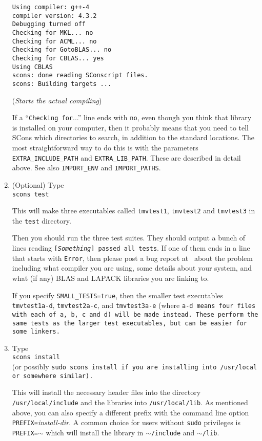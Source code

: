 \begin{enumerate}
\begin{verbatim}
Using compiler: g++-4
compiler version: 4.3.2
Debugging turned off
Checking for MKL... no
Checking for ACML... no
Checking for GotoBLAS... no
Checking for CBLAS... yes
Using CBLAS
scons: done reading SConscript files.
scons: Building targets ...
\end{verbatim}
\vspace{-8pt}(\emph{Starts the actual compiling})

If a ``\texttt{Checking for}...'' line ends with \texttt{no}, even though you think that library is installed
on your computer, then it probably means that you need to tell SCons which directories
to search, in addition to the standard locations.  The most straightforward way to do this is
with the parameters \texttt{EXTRA\_INCLUDE\_PATH} and \texttt{EXTRA\_LIB\_PATH}.  
These are described in detail above.  See also \texttt{IMPORT\_ENV} and \texttt{IMPORT\_PATHS}.

\item (Optional) Type\\
\texttt{scons test}

This will make three executables called \texttt{tmvtest1}, 
\texttt{tmvtest2} and \texttt{tmvtest3} in the \texttt{test} directory.

Then you should run the three test suites.
They should output a bunch of lines reading \texttt{[{\em Something}] passed all tests}.
If one of them ends in a line that starts with \texttt{Error}, 
then please post a bug report at \myissues\ about the problem including what compiler
you are using, some details about your system, and what (if any) BLAS and LAPACK
libraries you are linking to.

If you specify \texttt{SMALL\_TESTS=true}, then the smaller test executables
\texttt{tmvtest1a-d}, \texttt{tmvtest2a-c}, and \texttt{tmvtest3a-e} (where \tt{a-d} means 
four files with each of \tt{a}, \tt{b}, \tt{c} and \tt{d})
will be made instead.
These perform the same tests as the larger test executables, but can be easier
for some linkers.

\item Type\\
\texttt{scons install}\\
(or possibly \tt{sudo scons install} if you are installing into \tt{/usr/local} or somewhere similar).

This will install the necessary header files into the directory \texttt{/usr/local/include} and the libraries
into \texttt{/usr/local/lib}.  As mentioned above, you can also specify a different prefix 
with the command line option \texttt{PREFIX=}\emph{install-dir}.  A common choice for users
without \texttt{sudo} privileges is \texttt{PREFIX=$\sim$} which will install the library in \texttt{$\sim$/include}
and \texttt{$\sim$/lib}.


\end{enumerate}
